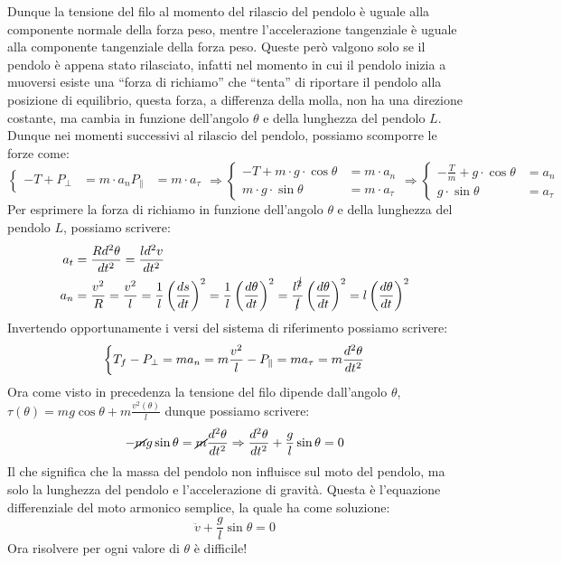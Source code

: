         Dunque la tensione del filo al momento del rilascio del pendolo è uguale alla componente normale della forza peso, mentre l'accelerazione tangenziale è uguale alla componente tangenziale della forza peso. Queste però valgono solo se il pendolo è appena stato rilasciato, infatti nel momento in cui il pendolo inizia a muoversi esiste una ``forza di richiamo'' che ``tenta'' di riportare il pendolo alla posizione di equilibrio, questa forza, a differenza della molla, non ha una direzione costante, ma cambia in funzione dell'angolo $\theta$ e della lunghezza del pendolo $L$. Dunque nei momenti successivi al rilascio del pendolo, possiamo scomporre le forze come:
        $$
            \left\{
                \begin{aligned}
                    -T + P_\perp &= m\cdot a_n
                    P_\parallel &= m\cdot a_\tau
                \end{aligned}
            \right.
            \Rightarrow \left\{
                \begin{aligned}
                    -T + m\cdot g\cdot \cos \theta &= m\cdot a_n \\
                    m\cdot g\cdot \sin \theta &= m\cdot a_\tau
                \end{aligned}
            \right.
            \Rightarrow \left\{
                \begin{aligned}
                    -\frac{T}m+g\cdot \cos \theta &= a_n \\
                    g\cdot \sin \theta &= a_\tau
                \end{aligned}
            \right.
        $$
        Per esprimere la forza di richiamo in funzione dell'angolo $\theta$ e della lunghezza del pendolo $L$, possiamo scrivere:
        $$
            \begin{aligned}
                a_t &= \frac{R d^2\theta}{dt^2} = \frac{l d^2 v}{dt^2}\\
                a_n &= \frac{v^2}{R} = \frac{v^2}{l}=\frac1l\left(\frac{ds}{dt}\right)^2 = \frac{1}{l}\left(\frac{d\theta}{dt}\right)^2 = \frac{l^{\cancel{2}}}{\cancel{l}} \left(\frac{d\theta}{dt}\right)^2 = l\left(\frac{d\theta}{dt}\right)^2
            \end{aligned}
        $$
        Invertendo opportunamente i versi del sistema di riferimento possiamo scrivere: $$
            \left\{
                T_f - P_\perp = m a_n = m\frac{v^2}l\\
                -P_\parallel = m a_\tau = m\frac{d^2\theta}{dt^2}
            \right.
        $$
        Ora come visto in precedenza la tensione del filo dipende dall'angolo $\theta$, $\tau(\theta)=mg\cos \theta + m\frac{v^2(\theta)}l$ dunque possiamo scrivere:
        $$
            -\cancel{m}g\sin \theta = \cancel{m}\frac{d^2\theta}{dt^2} \Rightarrow \frac{d^2\theta}{dt^2} + \frac{g}{l}\sin \theta = 0
        $$
        Il che significa che la massa del pendolo non influisce sul moto del pendolo, ma solo la lunghezza del pendolo e l'accelerazione di gravità. Questa è l'equazione differenziale del moto armonico semplice, la quale ha come soluzione:
        $$
            \ddot{v}+\frac{g}{l}\sin \theta = 0
        $$
        Ora risolvere per ogni valore di $\theta$ è difficile!
